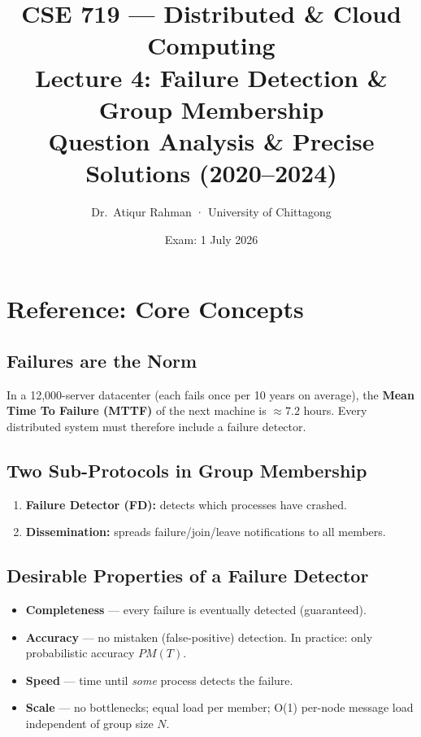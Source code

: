 \documentclass[12pt,a4paper]{article}
\title{\textbf{CSE 719 — Distributed \& Cloud Computing}\\
\large Lecture 4: Failure Detection \& Group Membership\\
\normalsize Question Analysis \& Precise Solutions (2020–2024)}
\author{Dr.\ Atiqur Rahman · University of Chittagong}
\date{Exam: 1 July 2026}
\begin{document}
\maketitle
\tableofcontents
\newpage

\section{Reference: Core Concepts}

\subsection{Failures are the Norm}
In a 12,000-server datacenter (each fails once per 10 years on average), the
\textbf{Mean Time To Failure (MTTF)} of the next machine is $\approx\!7.2$ hours.
Every distributed system must therefore include a failure detector.

\subsection{Two Sub-Protocols in Group Membership}
\begin{enumerate}
  \item \textbf{Failure Detector (FD):} detects which processes have crashed.
  \item \textbf{Dissemination:} spreads failure/join/leave notifications to all members.
\end{enumerate}

\subsection{Desirable Properties of a Failure Detector}
\begin{itemize}
  \item \textbf{Completeness} — every failure is eventually detected (guaranteed).
  \item \textbf{Accuracy} — no mistaken (false-positive) detection.
        In practice: only probabilistic accuracy $PM(T)$.
  \item \textbf{Speed} — time until \emph{some} process detects the failure.
  \item \textbf{Scale} — no bottlenecks; equal load per member; O(1) per-node
        message load independent of group size $N$.
\end{itemize}
\end{document}
